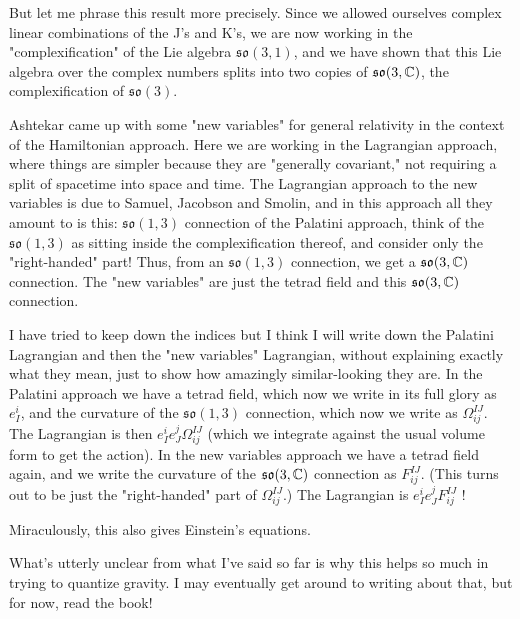 But let me phrase this result more precisely. Since we allowed ourselves complex linear combinations of the J's and K's, we are now working in the "complexification" of the Lie algebra $\mathfrak{so}(3,1)$, and we have shown that this Lie algebra over the complex numbers splits into two copies of $\mathfrak{so}(3,\mathbb C)$, the complexification of $\mathfrak{so}(3)$.

Ashtekar came up with some "new variables" for general relativity in the context of the Hamiltonian approach. Here we are working in the Lagrangian approach, where things are simpler because they are "generally covariant," not requiring a split of spacetime into space and time. The Lagrangian approach to the new variables is due to Samuel, Jacobson and Smolin, and in this approach all they amount to is this: $\mathfrak{so}(1,3)$ connection of the Palatini approach, think of the$\mathfrak{so}(1,3)$ as sitting inside the complexification thereof, and consider only the "right-handed" part! Thus, from an $\mathfrak{so}(1,3)$ connection, we get a $\mathfrak{so}(3,\mathbb C)$ connection. The "new variables" are just the tetrad field and this $\mathfrak{so}(3,\mathbb C)$ connection.

I have tried to keep down the indices but I think I will write down the Palatini Lagrangian and then the "new variables" Lagrangian, without explaining exactly what they mean, just to show how amazingly similar-looking they are. In the Palatini approach we have a tetrad field, which now we write in its full glory as $e_I^i$, and the curvature of the $\mathfrak{so}(1,3)$ connection, which now we write as $\Omega_{ij}^{IJ}$. The Lagrangian is then
$e_I^i e_J^j \Omega_{ij}^{IJ}$
(which we integrate against the usual volume form to get the action). In the new variables approach we have a tetrad field again, and we write the curvature of the $\mathfrak{so}(3,\mathbb C)$  connection as $F_{ij}^{IJ}$. (This turns out to be just the "right-handed" part of  $\Omega_{ij}^{IJ}$.) The Lagrangian is
$e_I^i e_J^j F_{ij}^{IJ}$ !

Miraculously, this also gives Einstein's equations.

What's utterly unclear from what I've said so far is why this helps so much in trying to quantize gravity. I may eventually get around to writing about that, but for now, read the book!


